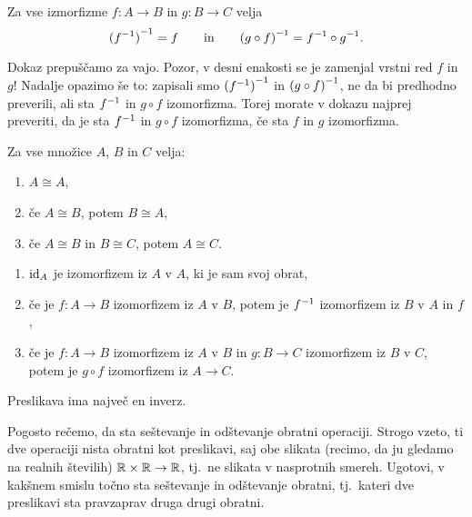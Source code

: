 \begin{trditev}
  Za vse izmorfizme $f : A \to B$ in $g : B \to C$ velja
  \begin{equation*}
    \inv{(\inv{f})} = f
    \qquad\text{in}\qquad
    \inv{(g \circ f)} = \inv{f} \circ \inv{g}.
  \end{equation*}
\end{trditev}

\begin{dokaz}
  Dokaz prepuščamo za vajo. Pozor, v desni enakosti se je zamenjal vrstni red $f$ in $g$!
  Nadalje opazimo še to: zapisali smo $\inv{(\inv{f})}$ in $\inv{(g \circ f)}$, ne da bi
  predhodno preverili, ali sta $\inv{f}$ in $g \circ f$ izomorfizma. Torej morate v dokazu
  najprej preveriti, da je sta $\inv{f}$ in $g \circ f$ izomorfizma, če sta $f$ in $g$
  izomorfizma.
\end{dokaz}

\begin{trditev}
  Za vse množice $A$, $B$ in $C$ velja:
  \begin{enumerate}
  \item $A \cong A$,
  \item če $A \cong B$, potem $B \cong A$,
  \item če $A \cong B$ in $B \cong C$, potem $A \cong C$.
  \end{enumerate}
\end{trditev}

\begin{dokaz}
  \parbox{0pt}{}
  \begin{enumerate}
  \item $\id[A]$ je izomorfizem iz $A$ v $A$, ki je sam svoj obrat,
  \item če je $f : A \to B$ izomorfizem iz $A$ v $B$, potem je $\inv{f}$ izomorfizem iz
    $B$ v $A$ in $f$,
  \item če je $f : A \to B$ izomorfizem iz $A$ v $B$ in $g : B \to C$ izomorfizem iz $B$ v
    $C$, potem je $g \circ f$ izomorfizem iz $A \to C$. \qedhere
  \end{enumerate}
\end{dokaz}

\begin{trditev}
  Preslikava ima največ en inverz.
\end{trditev}

\begin{vaja}
  Pogosto rečemo, da sta seštevanje in odštevanje obratni operaciji. Strogo vzeto, ti dve
  operaciji nista obratni kot preslikavi, saj obe slikata (recimo, da ju gledamo na
  realnih številih) $\RR \times \RR \to \RR$, tj.~ne slikata v nasprotnih smereh. Ugotovi,
  v kakšnem smislu točno sta seštevanje in odštevanje obratni, tj.~kateri dve preslikavi
  sta pravzaprav druga drugi obratni.
\end{vaja}

